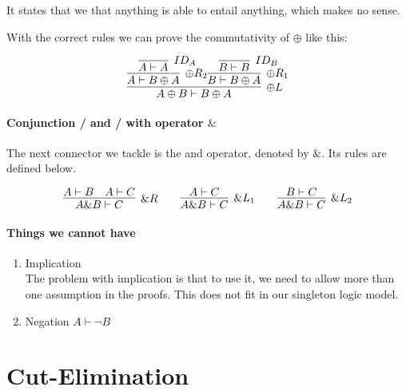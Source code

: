 \documentclass{article}
\begin{document}
It states that we that anything is able to entail anything, which makes no sense.

\medskip

With the correct rules we can prove  the commutativity of \(\oplus\) like this:

\[
\infer[{\oplus L}]
{A \oplus B \vdash B \oplus A}
{
	\infer[{\oplus R_2}]
	{A \vdash B \oplus A}
	{
		\infer[{ID_A}]
		{A \vdash A}
		{}
	}
	\infer[{\oplus R_1}]
	{B \vdash B \oplus A}
	{
		\infer[{ID_B}]
		{B \vdash B}
		{}
	}
}
\]



\paragraph{Conjunction / and / with operator \(\&\)}
The next connector we tackle is the and operator, denoted by \(\&\). Its rules are defined below. 

\[
\infer[{ \& R}]
{A \& B \vdash C}
{A \vdash B & A \vdash C}
\qquad
\infer[{\& L_1}]
{A \& B \vdash C}
{A \vdash C}
\qquad
\infer[{\& L_2}]
{A \& B \vdash C}
{B \vdash C}
\]


\paragraph{Things we cannot have}
\begin{enumerate}
	\item Implication \\
	      The problem with implication is that to use it, we need to allow 
	      more than one assumption in the proofs. This does not fit in our
	      singleton logic model.
	\item Negation \(A \vdash \neg B\)
\end{enumerate}





\section{Cut-Elimination}
\end{document}

